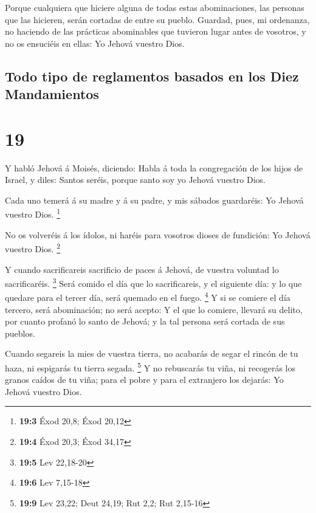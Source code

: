  Porque cualquiera que hiciere alguna de todas estas
abominaciones, las personas que las hicieren, serán cortadas de entre su
pueblo.  Guardad, pues, mi ordenanza, no haciendo de las
prácticas abominables que tuvieron lugar antes de vosotros, y no os
ensuciéis en ellas: Yo Jehová vuestro Dios.

\hypertarget{todo-tipo-de-reglamentos-basados-en-los-diez-mandamientos}{%
\subsection{Todo tipo de reglamentos basados \hspace{0pt}\hspace{0pt}en
los Diez
Mandamientos}\label{todo-tipo-de-reglamentos-basados-en-los-diez-mandamientos}}

\hypertarget{section-18}{%
\section{19}\label{section-18}}

 Y habló Jehová á Moisés, diciendo:  Habla á
toda la congregación de los hijos de Israel, y diles: Santos seréis,
porque santo soy yo Jehová vuestro Dios.

 Cada uno temerá á su madre y á su padre, y mis sábados
guardaréis: Yo Jehová vuestro Dios. \footnote{\textbf{19:3} Éxod 20,8;
  Éxod 20,12}

 No os volveréis á los ídolos, ni haréis para vosotros
dioses de fundición: Yo Jehová vuestro Dios. \footnote{\textbf{19:4}
  Éxod 20,3; Éxod 34,17}

 Y cuando sacrificareis sacrificio de paces á Jehová, de
vuestra voluntad lo sacrificaréis. \footnote{\textbf{19:5} Lev 22,18-20}
 Será comido el día que lo sacrificareis, y el siguiente
día: y lo que quedare para el tercer día, será quemado en el fuego.
\footnote{\textbf{19:6} Lev 7,15-18}  Y si se comiere el
día tercero, será abominación; no será acepto:  Y el que
lo comiere, llevará su delito, por cuanto profanó lo santo de Jehová; y
la tal persona será cortada de sus pueblos.

 Cuando segareis la mies de vuestra tierra, no acabarás de
segar el rincón de tu haza, ni espigarás tu tierra segada. \footnote{\textbf{19:9}
  Lev 23,22; Deut 24,19; Rut 2,2; Rut 2,15-16}  Y no
rebuscarás tu viña, ni recogerás los granos caídos de tu viña; para el
pobre y para el extranjero los dejarás: Yo Jehová vuestro Dios.

